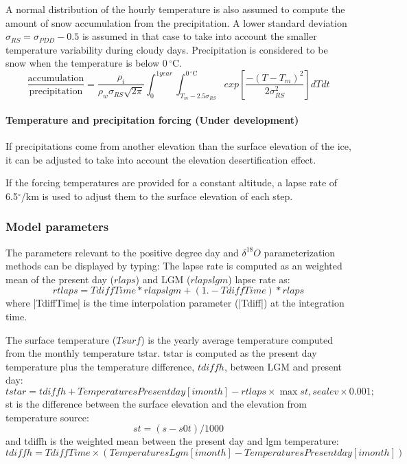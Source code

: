 A normal distribution of the hourly temperature is also assumed to compute the amount of snow accumulation from the precipitation. A lower standard deviation $\sigma_{RS} = \sigma_{PDD}-0.5$ is assumed in that case to take into account the smaller temperature variability during cloudy days. Precipitation is considered to be snow when the temperature is below 0$\,^{\circ}\mathrm{C}$.
\begin{equation}
	\frac{\text{accumulation}}{\text{precipitation}} =\frac{\rho_i}{\rho_w\sigma_{RS}\sqrt{2\pi}}
	\int_0^{1year}\int_{T_m-2.5\sigma_{RS}}^{0\,^{\circ}\mathrm{C}}
	exp\left[\frac{-(T-T_m)^2}{2\sigma_{RS}^2} \right] dTdt
\end{equation}

\paragraph{Temperature and precipitation forcing (Under development)}
If precipitations come from another elevation than the surface elevation of the ice, it can be adjusted to take into account the elevation desertification effect.

If the forcing temperatures are provided for a constant altitude, a lapse rate of 6.5$^\circ$/km is used to adjust them to the surface elevation of each step.

\subsubsection{Model parameters}
The parameters relevant to the positive degree day and $\delta^{18}O$ parameterization methods can be displayed by typing: The lapse rate is computed as an weighted mean of the present day ($rlaps$) and LGM ($rlapslgm$) lapse rate as:
\begin{equation}
	rtlaps=TdiffTime*rlapslgm + \left(1.-TdiffTime\right)*rlaps
\end{equation}
where \lstinlinebg|TdiffTime| is the time interpolation parameter (\lstinlinebg|Tdiff|) at the integration time.

The surface temperature ($Tsurf$) is the yearly average temperature computed from the monthly temperature tstar. tstar is computed as the present day temperature plus the temperature difference, $tdiffh$, between LGM and present day:
\begin{equation}
	tstar = tdiffh + TemperaturesPresentday[imonth] - rtlaps \times \max{st,sealev \times 0.001};
\end{equation}
st is the difference between the surface elevation and the elevation from temperature source:
\begin{equation}
	st=(s-s0t)/1000
\end{equation}
and tdiffh is the weighted mean between the present day and lgm temperature:
\begin{equation}
	tdiffh = TdiffTime \times ( TemperaturesLgm[imonth] - TemperaturesPresentday[imonth] )
\end{equation}


